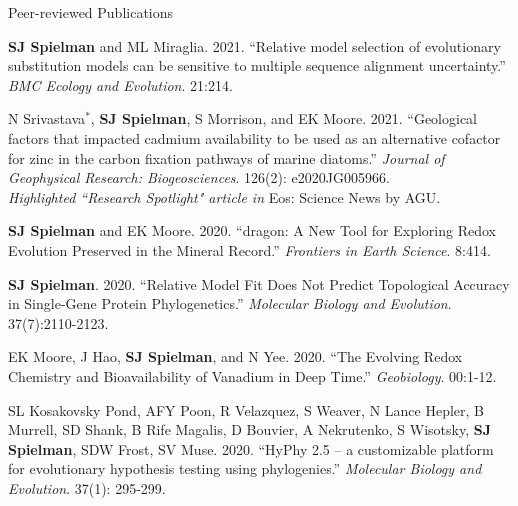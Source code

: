 \documentclass{resume} %
\begin{document}
\vspace*{0.35cm}
\begin{rSection}{Peer-reviewed Publications}
\vspace*{0.25cm}

\begin{etaremune}[leftmargin=1.5em]

\item \textbf{SJ Spielman} and ML Miraglia. 2021. ``Relative model selection of evolutionary substitution models can be sensitive to multiple sequence alignment uncertainty.'' \emph{BMC Ecology and Evolution}. 21:214. 

\item N Srivastava$^\ast$, \textbf{SJ Spielman}, S Morrison, and EK Moore. 2021. ``Geological factors that impacted cadmium availability to be used as an alternative cofactor for zinc in the carbon fixation pathways of marine diatoms.'' \emph{Journal of Geophysical Research: Biogeosciences}. 126(2): e2020JG005966. \\
\emph{Highlighted ``Research Spotlight" article in} Eos: Science News by AGU.

\item \textbf{SJ Spielman} and EK Moore. 2020. ``dragon: A New Tool for Exploring Redox Evolution Preserved in the Mineral Record.'' \emph{Frontiers in Earth Science}. 8:414.

\item \textbf{SJ Spielman}. 2020. ``Relative Model Fit Does Not Predict Topological Accuracy in Single-Gene Protein Phylogenetics.'' \emph{Molecular Biology and Evolution}. 37(7):2110-2123.

\item EK Moore, J Hao, \textbf{SJ Spielman}, and N Yee. 2020. ``The Evolving Redox Chemistry and Bioavailability of Vanadium in Deep Time.'' \emph{Geobiology}. 00:1-12.

\item SL Kosakovsky Pond, AFY Poon, R Velazquez, S Weaver, N Lance Hepler, B Murrell, SD Shank, B Rife Magalis, D Bouvier, A Nekrutenko, S Wisotsky, \textbf{SJ Spielman}, SDW Frost, SV Muse. 2020. ``HyPhy 2.5 – a customizable platform for evolutionary hypothesis testing using phylogenies.'' \emph{Molecular Biology and Evolution}. 37(1): 295-299.


\end{etaremune}
\end{rSection}
\end{document}

